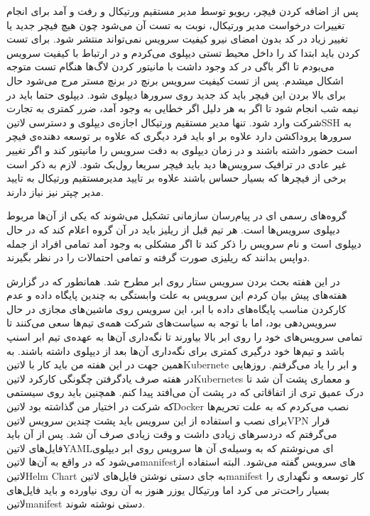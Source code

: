\documentclass[a4]{report}
\begin{document}
پس از اضافه کردن فیچر، ریویو توسط مدیر مستقیم ورتیکال و رفت و آمد برای انجام تغییرات درخواست مدیر ورتیکال، نوبت به تست آن می‌شود
چون هیچ فیچر جدید یا تغییر زیاد در کد بدون امضای نیرو کیفیت سرویس نمی‌تواند منتشر شود. برای تست کردن باید ابتدا کد را داخل محیط تستی دیپلوی می‌کردم و در ارتباط با کیفیت سرویس می‌بودم
تا اگر باگی در کد وجود داشت با مانیتور کردن لاگ‌ها هنگام تست متوجه اشکال میشدم. پس از تست کیفیت سرویس برنچ در برنچ مستر مرج می‌شود
حال برای بالا بردن این فیچر باید کد جدید روی سرورها دیپلوی شود.
دیپلوی حتما باید در نیمه شب انجام شود تا اگر به هر دلیل اگر خطایی به وجود آمد، ضرر کمتری به تجارت شرکت وارد شود. تنها مدیر مستقیم ورتیکال اجازه‌ی دیپلوی و دسترسی ‌لاتین{SSH} به سرورها
پروداکشن دارد علاوه بر او باید فرد دیگری که علاوه بر توسعه دهنده‌ی فیچر است حضور داشته باشند و در زمان دیپلوی به دقت سرویس را مانیتور کند و اگر تغییر غیر عادی در ترافیک سرویس‌ها
دید باید فیچر سریعا رول‌بک شود. لازم به ذکر است برخی از فیچرها که بسیار حساس باشند علاوه بر تایید مدیرمستقیم ورتیکال به تایید مدیر چپتر نیز نیاز دارند.

گروه‌های رسمی ای در پیام‌رسان سازمانی تشکیل می‌شوند که یکی از آن‌ها مربوط دیپلوی سرویس‌ها است. هر تیم قبل از ریلیز باید در آن گروه اعلام کند که در حال دیپلوی است و نام سرویس را ذکر کند
تا اگر مشکلی به وجود آمد تمامی افراد از جمله دواپس بدانند که ریلیزی صورت گرفته و تمامی احتمالات را در نظر بگیرند.


در این هفته بحث بردن سرویس ستار روی ابر مطرح شد. همانطور که در گزارش هفته‌های پیش بیان کردم این سرویس به علت وابستگی به چندین پایگاه داده و
عدم کارکردن مناسب پایگاه‌های داده با ابر، این سرویس روی ماشین‌های مجازی در حال سرویس‌دهی بود، اما با توجه به سیاست‌های شرکت همه‌ی تیم‌ها سعی می‌کنند
تا تمامی سرویس‌های خود را روی ابر بالا بیاورند تا نگه‌داری آن‌ها به عهده‌ی تیم ابر اسنپ باشد و تیم‌ها خود درگیری کمتری برای نگه‌داری آن‌ها بعد از دیپلوی داشته باشند.
به همین جهت در این هفته من باید کار با ‌لاتین{Kubernete} و ابر را یاد می‌گرفتم.
روزهایی در هفته صرف یادگرفتن چگونگی کارکرد ‌لاتین{Kubernetes} و معماری پشت آن شد تا درک عمیق تری از اتفاقاتی که در پشت آن می‌افتد پیدا کنم.
همچنین باید روی سیستمی که شرکت در اختیار من گذاشته بود ‌لاتین{Docker} نصب می‌کردم که به علت تحریم‌ها برای نصب و استفاده از این سرویس باید پشت
چندین سرویس ‌لاتین{VPN} قرار می‌گرفتم که دردسرهای زیادی داشت و وقت زیادی صرف آن شد.
پس از آن باید فایل‌های ‌لاتین{YAML}ای می‌نوشتم که به وسیله‌ی آن ها سرویس روی ابر دیپلوی می‌شود که در واقع به آن‌ها ‌لاتین{manifest}های سرویس گفته می‌شود.
البته استفاده از ‌لاتین{Helm Chart} به جای دستی نوشتن فایل‌های ‌لاتین{manifest} کار توسعه و نگهداری را بسیار راحت‌تر می کرد اما ورتیکال یوزر هنوز به آن روی نیاورده و باید فایل‌های
‌لاتین{manifest} دستی نوشته شوند.
\end{document}
